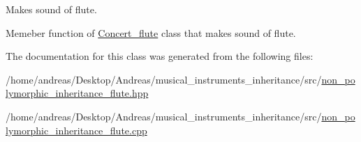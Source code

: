 Makes sound of flute. 

Memeber function of \hyperlink{classConcert__flute}{Concert\+\_\+flute} class that makes sound of flute. 

The documentation for this class was generated from the following files\+:\begin{DoxyCompactItemize}
\item 
/home/andreas/\+Desktop/\+Andreas/musical\+\_\+instruments\+\_\+inheritance/src/\hyperlink{non__polymorphic__inheritance__flute_8hpp}{non\+\_\+polymorphic\+\_\+inheritance\+\_\+flute.\+hpp}\item 
/home/andreas/\+Desktop/\+Andreas/musical\+\_\+instruments\+\_\+inheritance/src/\hyperlink{non__polymorphic__inheritance__flute_8cpp}{non\+\_\+polymorphic\+\_\+inheritance\+\_\+flute.\+cpp}\end{DoxyCompactItemize}
